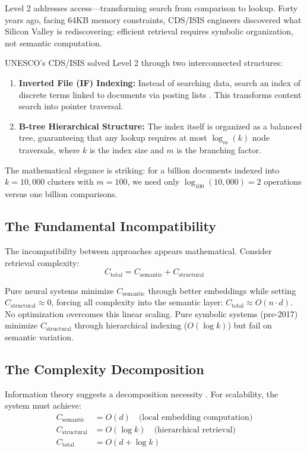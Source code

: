 \documentclass[manuscript,screen,nonacm]{acmart}
\begin{document}
Level 2 addresses access---transforming search from comparison to lookup. Forty years ago, facing 64KB memory constraints, CDS/ISIS engineers discovered what Silicon Valley is rediscovering: efficient retrieval requires symbolic organization, not semantic computation.

UNESCO's CDS/ISIS solved Level 2 through two interconnected structures:
\begin{enumerate}
    \item \textbf{Inverted File (IF) Indexing:} Instead of searching data, search an index of discrete terms linked to documents via posting lists \cite{zobel2006}. This transforms content search into pointer traversal.
    \item \textbf{B-tree Hierarchical Structure:} The index itself is organized as a balanced tree, guaranteeing that any lookup requires at most $\log_m(k)$ node traversals, where $k$ is the index size and $m$ is the branching factor.
\end{enumerate}

The mathematical elegance is striking: for a billion documents indexed into $k=10,000$ clusters with $m=100$, we need only $\log_{100}(10,000) = 2$ operations versus one billion comparisons.

\subsection{The Fundamental Incompatibility}

The incompatibility between approaches appears mathematical. Consider retrieval complexity:
\begin{equation}
C_{\text{total}} = C_{\text{semantic}} + C_{\text{structural}}
\label{eq:complexity}
\end{equation}

Pure neural systems minimize $C_{\text{semantic}}$ through better embeddings while setting $C_{\text{structural}} \approx 0$, forcing all complexity into the semantic layer: $C_{\text{total}} \approx O(n \cdot d)$. No optimization overcomes this linear scaling. Pure symbolic systems (pre-2017) minimize $C_{\text{structural}}$ through hierarchical indexing ($O(\log k)$) but fail on semantic variation.

\subsection{The Complexity Decomposition}

Information theory suggests a decomposition necessity \cite{chen2025}. For scalability, the system must achieve:
\begin{align}
C_{\text{semantic}} &= O(d) \quad \text{(local embedding computation)} \label{eq:semantic}\\
C_{\text{structural}} &= O(\log k) \quad \text{(hierarchical retrieval)} \label{eq:structural}\\
C_{\text{total}} &= O(d + \log k) \label{eq:total}
\end{align}
\end{document}
